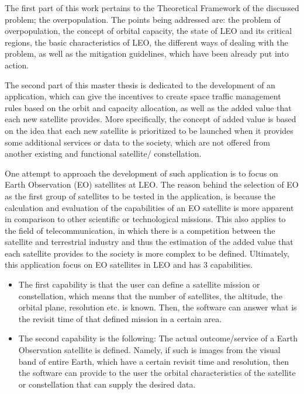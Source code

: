 
The first part of this work pertains to the Theoretical Framework of the discussed problem; the overpopulation. The points being addressed are: the problem of overpopulation, the concept of orbital capacity, the state of LEO and its critical regions, the basic characteristics of LEO, the different ways of dealing with the problem, as well as the mitigation guidelines, which have been already put into action.

The second part of this master thesis is dedicated to the development of an application, which can give the incentives to create space traffic management rules based on the orbit and capacity allocation, as well as the added value that each new satellite provides. More specifically, the concept of added value is based on the idea that each new satellite is prioritized to be launched when it provides some additional services or data to the society, which are not offered from another existing and functional satellite/ constellation.

One attempt to approach the development of such application is to focus on Earth Observation (EO) satellites at LEO. The reason behind the selection of EO as the first group of satellites to be tested in the application, is because the calculation and evaluation of the capabilities of an EO satellite is more apparent in comparison to other scientific or technological missions. This also applies to the field of telecommunication, in which there is a competition between the satellite and terrestrial industry and thus the estimation of the added value that each satellite provides to the society is more complex to be defined. Ultimately, this application focus on EO satellites in LEO and has 3 capabilities.
%

\begin{itemize}
\item The first capability is that the user can define a satellite mission or constellation, which means that the number of satellites, the altitude, the orbital plane, resolution etc. is known. Then, the software can answer what is the revisit time of that defined mission in a certain area.
\item The second capability is the following: The actual outcome/service of a Earth Observation satellite is defined. Namely, if such is images from the visual band of entire Earth, which have a certain revisit time and resolution, then the software can provide to the user the orbital characteristics of the satellite or constellation that can supply the desired data.
\end{itemize}

